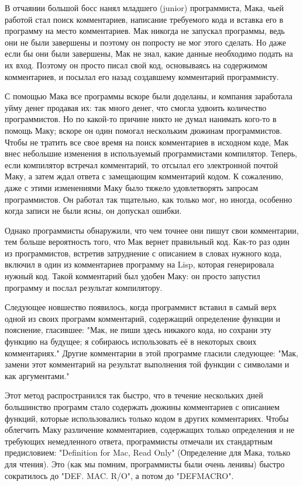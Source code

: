 В отчаянии большой босс нанял младшего (junior) программиста, Мака, чьей работой стал
поиск комментариев, написание требуемого кода и вставка его в программу на место
комментариев. Мак никогда не запускал программы, ведь они не были завершены и поэтому он
попросту не мог этого сделать. Но даже если бы они были завершены, Мак не знал, какие
данные необходимо подать на их вход. Поэтому он просто писал свой код, основываясь на
содержимом комментариев, и посылал его назад создавшему комментарий программисту.

С помощью Мака все программы вскоре были доделаны, и компания заработала уйму денег
продавая их: так много денег, что смогла удвоить количество программистов. Но по какой-то
причине никто не думал нанимать кого-то в помощь Маку; вскоре он один помогал нескольким
дюжинам программистов. Чтобы не тратить все свое время на поиск комментариев в исходном
коде, Мак внес небольшие изменения в используемый программистами компилятор. Теперь, если
компилятор встречал комментарий, то отсылал его электронной почтой Маку, а затем ждал
ответа с замещающим комментарий кодом. К сожалению, даже с этими изменениями Маку было
тяжело удовлетворять запросам программистов. Он работал так тщательно, как только мог, но
иногда, особенно когда записи не были ясны, он допускал ошибки.

Однако программисты обнаружили, что чем точнее они пишут свои комментарии, тем больше
вероятность того, что Мак вернет правильный код. Как-то раз один из программистов,
встретив затруднение с описанием в словах нужного кода, включил в один из комментариев
программу на Lisp, которая генерировала нужный код. Такой комментарий был удобен Маку: он
просто запустил программу и послал результат компилятору.

Следующее новшество появилось, когда программист вставил в самый верх одной из своих
программ комментарий, содержащий определение функции и пояснение, гласившее: "Мак, не пиши
здесь никакого кода, но сохрани эту функцию на будущее; я собираюсь использовать её в
некоторых своих комментариях." Другие комментарии в этой программе гласили следующее:
"Мак, замени этот комментарий на результат выполнения той функции с символами  и
 как аргументами."

Этот метод распространился так быстро, что в течение нескольких дней большинство программ
стало содержать дюжины комментариев с описанием функций, которые использовались только
кодом в других комментариях. Чтобы облегчить Маку различение комментариев, содержащих
только определения и не требующих немедленного ответа, программисты отмечали их
стандартным предисловием: "Definition for Mac, Read Only" (Определение для Мака, только
для чтения). Это (как мы помним, программисты были очень ленивы) быстро сократилось до
"DEF. MAC. R/O", а потом до "DEFMACRO".

